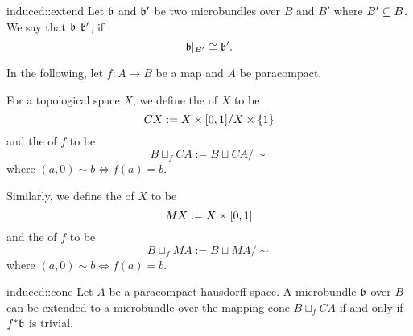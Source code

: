 \begin{mydefinition}{induced::extend}{}
    Let $\mathfrak{b}$ and $\mathfrak{b}'$ be two microbundles over $B$ and $B'$ where $B' \subseteq{} B$.
    We say that $\mathfrak{b}$  $\mathfrak{b}'$, if
    \[ \mathfrak{b}\vert_{B'} \cong \mathfrak{b}'. \]
\end{mydefinition}

\begin{myparagraph}
    In the following, let $f: A \to B$ be a map and $A$ be paracompact.
    
    For a topological space $X$, we define the  of $X$ to be 
    \[ CX := X \times{} [0, 1] / X \times \{1\} \]
    and the  of $f$ to be
    \[ B \sqcup_f CA := B \sqcup CA / \sim \]
    where $(a, 0) \sim b \iff f(a) = b$.
    
    Similarly, we define the  of $X$ to be
    \[ MX := X \times{} [0, 1] \]
    and the  of $f$ to be
    \[ B \sqcup_f MA := B \sqcup MA / \sim \]
    where $(a, 0) \sim b \iff f(a) = b$.
\end{myparagraph}

\begin{mylemma}{induced::cone}{}
    Let $A$ be a paracompact hausdorff space.
    A microbundle $\mathfrak{b}$ over $B$ can be extended to a microbundle
    over the mapping cone $B \sqcup_f CA$ if and only if $f^*\mathfrak{b}$ is trivial.
\end{mylemma}

